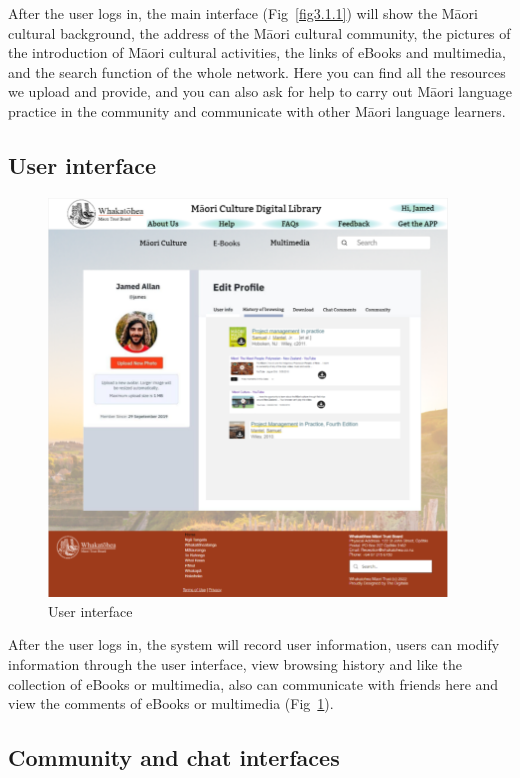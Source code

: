 After the user logs in, the main interface (Fig~\ref{fig3.1.1}) will show the Māori cultural background, the address of the Māori cultural community, the pictures of the introduction of Māori cultural activities, the links of eBooks and multimedia, and the search function of the whole network. Here you can find all the resources we upload and provide, and you can also ask for help to carry out Māori language practice in the community and communicate with other Māori language learners.

\subsection{User interface}

\begin{figure}[htbp]
  \centerline{\includegraphics[width=300pt]{images/3-1-2.png}}
  \caption{User interface}
  \label{fig3.1.2}
\end{figure}

After the user logs in, the system will record user information, users can modify information through the user interface, view browsing history and like the collection of eBooks or multimedia, also can communicate with friends here and view the comments of eBooks or multimedia (Fig~\ref{fig3.1.2}).

\subsection{Community and chat interfaces}

